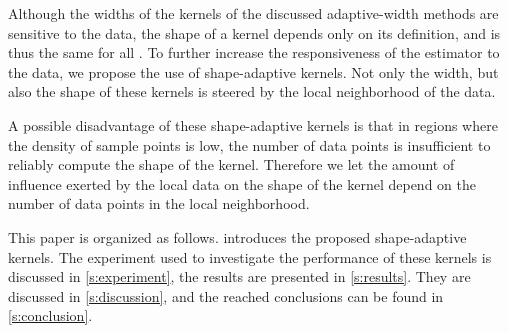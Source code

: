 	Although the widths of the kernels of the discussed adaptive-width methods are sensitive to the data, the shape of a kernel depends only on its definition, and is thus the same for all \varPattern[\itXis]. To further increase the responsiveness of the estimator to the data, we propose the use of shape-adaptive kernels. Not only the width, but also the shape of these kernels is steered by the local neighborhood of the data.

	A possible disadvantage of these shape-adaptive kernels is that in regions where the density of sample points is low, the number of data points is insufficient to reliably compute the shape of the kernel. Therefore we let the amount of influence exerted by the local data on the shape of the kernel depend on the number of data points in the local neighborhood.

	This paper is organized as follows.  introduces the proposed shape-adaptive kernels. The experiment used to investigate the performance of these kernels is discussed in \cref{s:experiment}, the results are presented in \cref{s:results}. They are discussed in \cref{s:discussion}, and the reached conclusions can be found in \cref{s:conclusion}.
